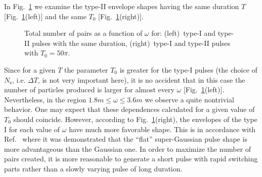 \documentclass[preprint,aps,prd,showpacs,floatfix]{revtex4-1}
\begin{document}
\indent In Fig.~\ref{fig:total2} we examine the type-II envelope shapes having the same duration $T$ [Fig.~\ref{fig:total2}(left)] and the same $T_0$ [Fig.~\ref{fig:total2}(right)].
%
\begin{figure}[h]
\caption{Total number of pairs as a function of $\omega$ for: (left)~type-I and type-II pulses with the same duration, (right)~type-I and type-II pulses with $T_0 = 50\pi$.}
\label{fig:total2}
\end{figure}
%
Since for a given $T$ the parameter $T_0$ is greater for the type-I pulses (the choice of $N_\text{s}$, i.e. $\Delta T$, is not very important here), it is no accident that in this case the number of particles produced is larger for almost every $\omega$ [Fig.~\ref{fig:total2}(left)]. Nevertheless, in the region $1.8m \leq \omega \leq 3.6m$ we observe a quite nontrivial behavior. One may expect that these dependences calculated for a given value of $T_0$ should coincide. However, according to Fig.~\ref{fig:total2}(right), the envelopes of the type I for each value of $\omega$ have much more favorable shape. This is in accordance with Ref.~\cite{abdukerim_plb_2013} where it was demonstrated that the ``flat'' super-Gaussian pulse shape is more advantageous than the Gaussian one. In order to maximize the number of pairs created, it is more reasonable to generate a short pulse with rapid switching parts rather than a slowly varying pulse of long duration.
\end{document}
